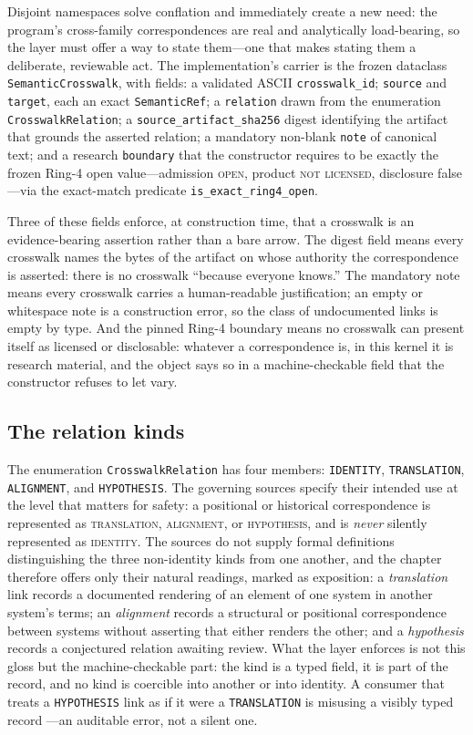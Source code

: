 Disjoint namespaces solve conflation and immediately create a new
need: the program's cross-family correspondences are real and
analytically load-bearing, so the layer must offer a way to state
them---one that makes stating them a deliberate, reviewable act.
The implementation's carrier is the frozen dataclass
\texttt{SemanticCrosswalk}, with fields: a validated ASCII
\texttt{crosswalk\_id}; \texttt{source} and \texttt{target}, each
an exact \texttt{SemanticRef}; a \texttt{relation} drawn from the
enumeration \texttt{CrosswalkRelation}; a
\texttt{source\_artifact\_sha256} digest identifying the artifact
that grounds the asserted relation; a mandatory non-blank
\texttt{note} of canonical text; and a research \texttt{boundary}
that the constructor requires to be exactly the frozen Ring-4 open
value---admission \textsc{open}, product \textsc{not licensed},
disclosure false---via the exact-match predicate
\texttt{is\_exact\_ring4\_open}.

Three of these fields enforce, at construction time, that a
crosswalk is an evidence-bearing assertion rather than a bare
arrow. The digest field means every crosswalk names the bytes of
the artifact on whose authority the correspondence is asserted:
there is no crosswalk ``because everyone knows.'' The mandatory
note means every crosswalk carries a human-readable justification;
an empty or whitespace note is a construction error, so the class
of undocumented links is empty by type. And the pinned Ring-4
boundary means no crosswalk can present itself as licensed or
disclosable: whatever a correspondence is, in this kernel it is
research material, and the object says so in a machine-checkable
field that the constructor refuses to let vary.

\subsection{The relation kinds}\label{ch03:kinds}

The enumeration \texttt{CrosswalkRelation} has four members:
\texttt{IDENTITY}, \texttt{TRANSLATION}, \texttt{ALIGNMENT}, and
\texttt{HYPOTHESIS}. The governing sources specify their intended
use at the level that matters for safety: a positional or
historical correspondence is represented as \textsc{translation},
\textsc{alignment}, or \textsc{hypothesis}, and is \emph{never}
silently represented as \textsc{identity}. The sources do not
supply formal definitions distinguishing the three non-identity
kinds from one another, and the chapter therefore offers only
their natural readings, marked as exposition: a
\emph{translation} link records a documented rendering of an
element of one system in another system's terms; an
\emph{alignment} records a structural or positional correspondence
between systems without asserting that either renders the other;
and a \emph{hypothesis} records a conjectured relation awaiting
review. What the layer enforces is not this gloss but the
machine-checkable part: the kind is a typed field, it is part of
the record, and no kind is coercible into another or into
identity. A consumer that treats a \texttt{HYPOTHESIS} link as if
it were a \texttt{TRANSLATION} is misusing a visibly typed record
---an auditable error, not a silent one.

